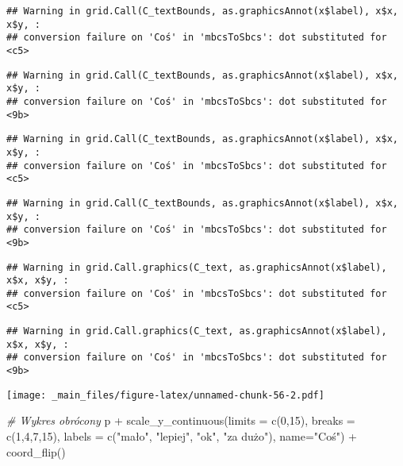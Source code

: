 \documentclass[
]{book}
\newenvironment{Shaded}{\begin{snugshade}}{\end{snugshade}}
\newcommand{\AttributeTok}[1]{\textcolor[rgb]{0.77,0.63,0.00}{#1}}
\newcommand{\CommentTok}[1]{\textcolor[rgb]{0.56,0.35,0.01}{\textit{#1}}}
\newcommand{\DecValTok}[1]{\textcolor[rgb]{0.00,0.00,0.81}{#1}}
\newcommand{\FunctionTok}[1]{\textcolor[rgb]{0.00,0.00,0.00}{#1}}
\newcommand{\NormalTok}[1]{#1}
\newcommand{\SpecialCharTok}[1]{\textcolor[rgb]{0.00,0.00,0.00}{#1}}
\newcommand{\StringTok}[1]{\textcolor[rgb]{0.31,0.60,0.02}{#1}}
\begin{document}
\begin{verbatim}
## Warning in grid.Call(C_textBounds, as.graphicsAnnot(x$label), x$x, x$y, :
## conversion failure on 'Coś' in 'mbcsToSbcs': dot substituted for <c5>
\end{verbatim}

\begin{verbatim}
## Warning in grid.Call(C_textBounds, as.graphicsAnnot(x$label), x$x, x$y, :
## conversion failure on 'Coś' in 'mbcsToSbcs': dot substituted for <9b>
\end{verbatim}

\begin{verbatim}
## Warning in grid.Call(C_textBounds, as.graphicsAnnot(x$label), x$x, x$y, :
## conversion failure on 'Coś' in 'mbcsToSbcs': dot substituted for <c5>
\end{verbatim}

\begin{verbatim}
## Warning in grid.Call(C_textBounds, as.graphicsAnnot(x$label), x$x, x$y, :
## conversion failure on 'Coś' in 'mbcsToSbcs': dot substituted for <9b>
\end{verbatim}

\begin{verbatim}
## Warning in grid.Call.graphics(C_text, as.graphicsAnnot(x$label), x$x, x$y, :
## conversion failure on 'Coś' in 'mbcsToSbcs': dot substituted for <c5>
\end{verbatim}

\begin{verbatim}
## Warning in grid.Call.graphics(C_text, as.graphicsAnnot(x$label), x$x, x$y, :
## conversion failure on 'Coś' in 'mbcsToSbcs': dot substituted for <9b>
\end{verbatim}

\texttt{[image: \_main\_files/figure-latex/unnamed-chunk-56-2.pdf]}

\begin{Shaded}
\begin{Highlighting}[]
\CommentTok{\# Wykres obrócony}
\NormalTok{p }\SpecialCharTok{+} \FunctionTok{scale\_y\_continuous}\NormalTok{(}\AttributeTok{limits =} \FunctionTok{c}\NormalTok{(}\DecValTok{0}\NormalTok{,}\DecValTok{15}\NormalTok{), }\AttributeTok{breaks =} \FunctionTok{c}\NormalTok{(}\DecValTok{1}\NormalTok{,}\DecValTok{4}\NormalTok{,}\DecValTok{7}\NormalTok{,}\DecValTok{15}\NormalTok{), }
                       \AttributeTok{labels =} \FunctionTok{c}\NormalTok{(}\StringTok{"mało"}\NormalTok{, }\StringTok{"lepiej"}\NormalTok{, }\StringTok{"ok"}\NormalTok{, }\StringTok{"za dużo"}\NormalTok{), }
                       \AttributeTok{name=}\StringTok{"Coś"}\NormalTok{) }\SpecialCharTok{+} \FunctionTok{coord\_flip}\NormalTok{()}
\end{Highlighting}
\end{Shaded}
\end{document}
